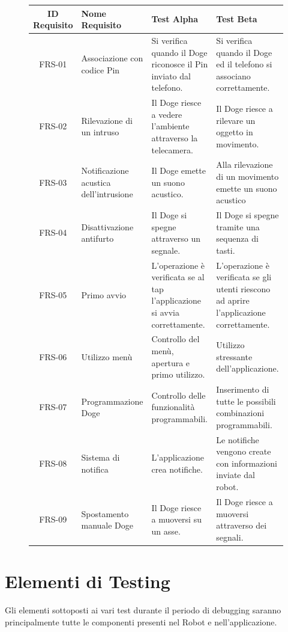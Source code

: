 \documentclass{article}
\begin{document}
\begin{figure}[htbp]
\centering
\begin{tabular}{| c | p{4cm} p{4cm} p{4cm} |}
\hline
\textbf{ID Requisito} & \textbf{Nome Requisito} & \textbf{Test Alpha} & \textbf{Test Beta} \\ \hline
FRS-01 & Associazione con codice Pin & Si verifica quando il Doge riconosce il Pin inviato dal telefono. & Si verifica quando il Doge ed il telefono si associano
correttamente. \\ \hline
FRS-02 & Rilevazione di un intruso & Il Doge riesce a vedere l'ambiente attraverso la telecamera. & Il Doge riesce a rilevare un oggetto in movimento. \\ \hline
FRS-03 & Notificazione acustica dell'intrusione & Il Doge emette un suono acustico. & Alla rilevazione di un movimento emette un suono acustico \\ \hline
FRS-04 & Disattivazione antifurto & Il Doge si spegne attraverso un segnale. & Il Doge si spegne tramite una sequenza di tasti. \\ \hline
FRS-05 & Primo avvio & L'operazione è verificata se al tap l'applicazione si avvia
correttamente. & L'operazione è verificata se gli utenti riescono ad aprire
l'applicazione correttamente. \\ \hline
FRS-06 & Utilizzo menù & Controllo del menù, apertura e primo utilizzo. & Utilizzo stressante dell'applicazione. \\ \hline
FRS-07 & Programmazione Doge & Controllo delle funzionalità programmabili. & Inserimento di tutte le possibili combinazioni programmabili. \\ \hline
FRS-08 & Sistema di notifica & L'applicazione crea notifiche. & Le notifiche vengono create con informazioni inviate dal robot. \\ \hline
FRS-09 & Spostamento manuale Doge & Il Doge riesce a muoversi su un asse. & Il Doge riesce a muoversi attraverso dei segnali. \\
\hline
\end{tabular}
\end{figure}

\section{Elementi di Testing}

Gli elementi sottoposti ai vari test durante il periodo di debugging
saranno principalmente tutte le componenti presenti nel Robot e
nell'applicazione.
\end{document}

